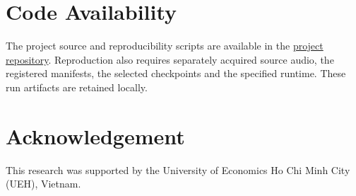 \section*{Code Availability}
The project source and reproducibility scripts are available in the \href{https://github.com/datweb07/audio-deepfake-mobilenet-lstm}{project repository}. Reproduction also requires separately acquired source audio, the registered manifests, the selected checkpoints and the specified runtime. These run artifacts are retained locally.

\section*{Acknowledgement}

This research was supported by the University of Economics Ho Chi Minh City (UEH), Vietnam.
